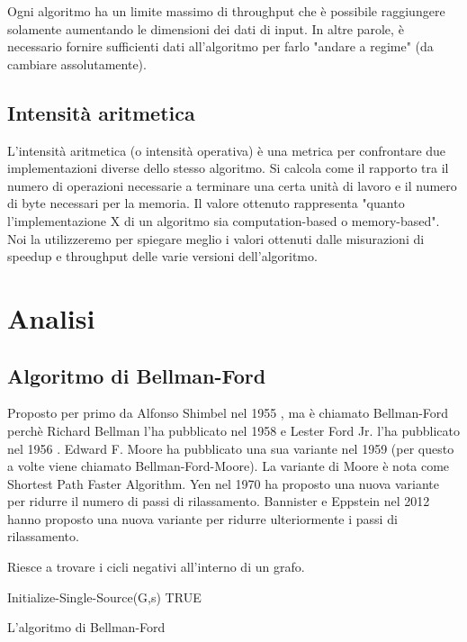 \documentclass[a4paper]{article}
\begin{document}
	Ogni algoritmo ha un limite massimo di throughput che è possibile raggiungere solamente aumentando le dimensioni dei dati di input. In altre parole, è necessario fornire sufficienti dati all'algoritmo per farlo "andare a regime" (da cambiare assolutamente).
	
	\subsection{Intensità aritmetica}
	L'intensità aritmetica (o intensità operativa) è una metrica per confrontare due implementazioni diverse dello stesso algoritmo. Si calcola come il rapporto tra il numero di operazioni necessarie a terminare una certa unità di lavoro e il numero di byte necessari per la memoria. Il valore ottenuto rappresenta "quanto l'implementazione X di un algoritmo sia computation-based o memory-based". Noi la utilizzeremo per spiegare meglio i valori ottenuti dalle misurazioni di speedup e throughput delle varie versioni dell'algoritmo.
	
	\section{Analisi}
	\label{section:analisi}
	\subsection{Algoritmo di Bellman-Ford}
	Proposto per primo da Alfonso Shimbel nel 1955 \cite{Shimbel1955}, ma è chiamato Bellman-Ford perchè Richard Bellman l'ha pubblicato nel 1958 \cite{Bellman1958} e Lester Ford Jr. l'ha pubblicato nel 1956 \cite{Ford1956}. Edward F. Moore ha pubblicato una sua variante nel 1959 \cite{Moore1959} (per questo a volte viene chiamato Bellman-Ford-Moore). La variante di Moore è nota come Shortest Path Faster Algorithm. Yen nel 1970 \cite{Yen1970} ha proposto una nuova variante per ridurre il numero di passi di rilassamento. Bannister e Eppstein nel 2012 \cite{Bannister2012} hanno proposto una nuova variante per ridurre ulteriormente i passi di rilassamento.
	
	Riesce a trovare i cicli negativi all'interno di un grafo.
	
	\begin{algorithm}[H]
		\label{alg:bf}
		Initialize-Single-Source(G,s)\;
		\Return TRUE\;
		\caption{L'algoritmo di Bellman-Ford}
	\end{algorithm}
\end{document}
